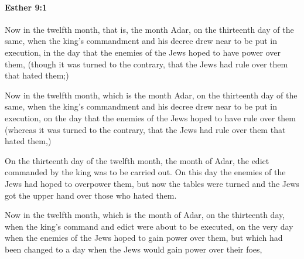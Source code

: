 		\paragraph{Esther 9:1} %
			\label{ESTHER-9-1}

			Now in the twelfth month, that is, the month Adar, on the thirteenth day of the same, when the king’s commandment and his decree drew near to be put in execution, in the day that the enemies of the Jews hoped to have power over them, (though it was turned to the contrary, that the Jews had rule over them that hated them;)

			\begin{versebox}
					\item[BHS] 
					\item[LXX] 
					\item[ASV] Now in the twelfth month, which is the month Adar, on the thirteenth day of the same, when the king's commandment and his decree drew near to be put in execution, on the day that the enemies of the Jews hoped to have rule over them (whereas it was turned to the contrary, that the Jews had rule over them that hated them,)
					\item[NIV] On the thirteenth day of the twelfth month, the month of Adar, the edict commanded by the king was to be carried out. On this day the enemies of the Jews had hoped to overpower them, but now the tables were turned and the Jews got the upper hand over those who hated them.
					\item[NRSV] Now in the twelfth month, which is the month of Adar, on the thirteenth day, when the king’s command and edict were about to be executed, on the very day when the enemies of the Jews hoped to gain power over them, but which had been changed to a day when the Jews would gain power over their foes,
			\end{versebox}

